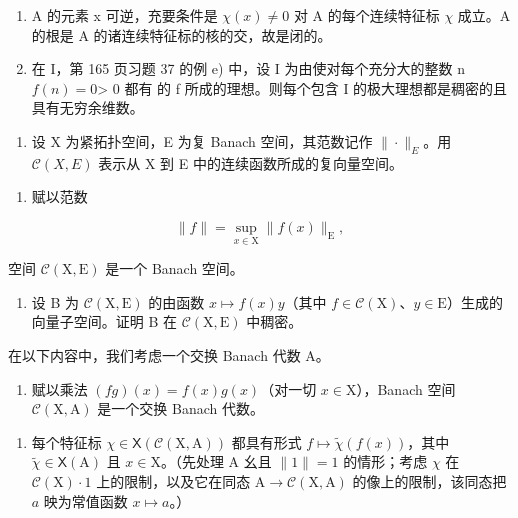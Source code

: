 \begin{enumerate}
\def\labelenumi{\alph{enumi})}
\item
  A 的元素 x 可逆，充要条件是 \(\chi(x) \neq 0\) 对 A 的每个连续特征标 \(\chi\) 成立。A 的根是 A 的诸连续特征标的核的交，故是闭的。
\item
  在 I，第 165 页习题 37 的例 e) 中，设 I 为由使对每个充分大的整数 n \(f(n) = 0\)\textgreater{ 0 都有 } 的 f 所成的理想。则每个包含 I 的极大理想都是稠密的且具有无穷余维数。
\end{enumerate}

\begin{enumerate}
\def\labelenumi{\arabic{enumi})}
\setcounter{enumi}{25}
\tightlist
\item
  设 X 为紧拓扑空间，E 为复 Banach 空间，其范数记作 \(\|\cdot\|_{E}\)。用 \(\mathcal{C}(X,E)\) 表示从 X 到 E 中的连续函数所成的复向量空间。
\end{enumerate}

\begin{enumerate}
\def\labelenumi{\alph{enumi})}
\tightlist
\item
  赋以范数
\end{enumerate}

\[
\| f \| = \sup _ {x \in \mathrm{X}} \| f (x) \| _ {\mathrm{E}},
\]

空间 \(\mathcal{C}(\mathrm{X},\mathrm{E})\) 是一个 Banach 空间。

\begin{enumerate}
\def\labelenumi{\alph{enumi})}
\setcounter{enumi}{1}
\tightlist
\item
  设 B 为 \(\mathcal{C}(\mathrm{X},\mathrm{E})\) 的由函数 \(x\mapsto f(x)y\)（其中 \(f\in \mathcal{C}(\mathrm{X})\)、\(y\in \mathrm{E}\)）生成的向量子空间。证明 B 在 \(\mathcal{C}(\mathrm{X},\mathrm{E})\) 中稠密。
\end{enumerate}

在以下内容中，我们考虑一个交换 Banach 代数 A。

\begin{enumerate}
\def\labelenumi{\alph{enumi})}
\setcounter{enumi}{2}
\tightlist
\item
  赋以乘法 \((fg)(x) = f(x)g(x)\)（对一切 \(x\in \mathrm{X}\)），Banach 空间 \(\mathcal{C}(\mathrm{X},\mathrm{A})\) 是一个交换 Banach 代数。
\end{enumerate}

\begin{enumerate}
\def\labelenumi{\alph{enumi})}
\setcounter{enumi}{3}
\tightlist
\item
  每个特征标 \(\chi\in\mathsf{X}(\mathcal{C}(\mathrm{X},\mathrm{A}))\) 都具有形式 \(f\mapsto\widetilde{\chi}(f(x))\)，其中 \(\widetilde{\chi}\in\mathsf{X}(\mathrm{A})\) 且 \(x\in\mathrm{X}\)。（先处理 A 幺且 \(\|1\|=1\) 的情形；考虑 \(\chi\) 在 \(\mathcal{C}(\mathrm{X})\cdot1\) 上的限制，以及它在同态 \(\mathrm{A}\to\mathcal{C}(\mathrm{X},\mathrm{A})\) 的像上的限制，该同态把 \(a\) 映为常值函数 \(x\mapsto a\)。）
\end{enumerate}

